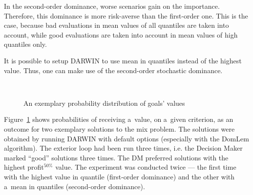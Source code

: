 In the second-order dominance, worse scenarios gain on the
importance. Therefore, this dominance is more risk-averse than the first-order
one. This is the case, because bad evaluations in mean values of all quantiles
are taken into account, while good evaluations are taken into account in mean
values of high quantiles only.

It is possible to setup DARWIN to use mean in quantiles instead of the highest
value. Thus, one can make use of the second-order stochastic dominance.

\begin{figure}[t]
  \centering
    \\
    \caption{An exemplary probability distribution of goals' values}
  \label{dom_comparision}
\end{figure}

Figure~\ref{dom_comparision} shows probabilities of receiving a~value, on
a~given criterion, as an outcome for two exemplary solutions to the mix
problem. The solutions were obtained by running DARWIN with default options
(especially with the DomLem algorithm). The exterior loop had been run three
times, i.e. the Decision Maker marked ``good'' solutions three times. The DM
preferred solutions with the highest profit$^{50\%}$ value. The experiment was
conducted twice --- the first time with the highest value in quantile
(first-order dominance) and the other with a~mean in quantiles (second-order
dominance).

